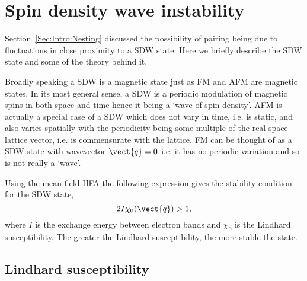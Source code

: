 
\section{Spin density wave instability}

Section~\ref{Sec:Intro:Nesting} discussed the possibility of \highTc pairing being due to fluctuations in close proximity to a \ac{SDW} state. Here we briefly describe the \ac{SDW} state and some of the theory behind it.

Broadly speaking a \ac{SDW} is a magnetic state just as \ac{FM} and \ac{AFM} are magnetic states. In its most general sense, a \ac{SDW} is a periodic modulation of magnetic spins in both space and time hence it being a `wave of spin density'. \ac{AFM} is actually a special case of a \ac{SDW} which does not vary in time, i.e. is static, and also varies spatially with the periodicity being some multiple of the real-space lattice vector, i.e. is commensurate with the lattice. \ac{FM} can be thought of as a \ac{SDW} state with wavevector $\vect{q}=0$ i.e. it has no periodic variation and so is not really a `wave'.

Using the mean field \ac{HFA} the following expression gives the stability condition for the \ac{SDW} state\cite{Moriya1985},
\begin{equation}
2I\chi_0(\vect{q}) > 1,
\end{equation}
where $I$ is the exchange energy between electron bands and $\chi_0$ is the Lindhard susceptibility. The greater the Lindhard susceptibility, the more stable the state.

\subsection{Lindhard susceptibility}
\label{Sec:Theo:Susceptibility}

